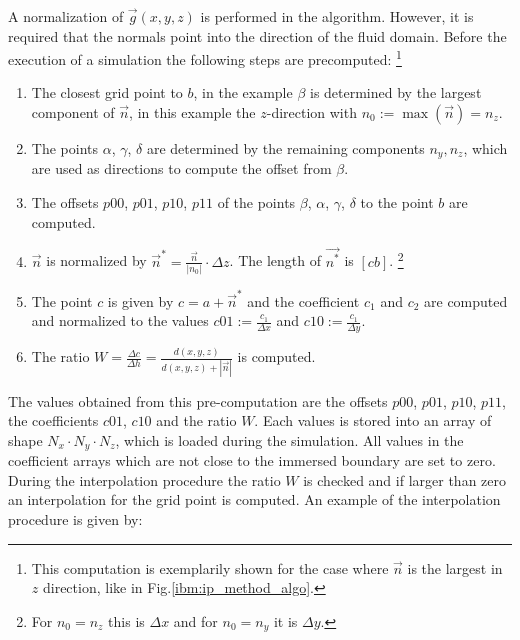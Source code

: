 A normalization of $\vec{g}(x, y, z)$ is performed in the algorithm.
However, it is required that the normals point into the direction of the fluid domain.
Before the execution of a simulation the following steps are precomputed:
\footnote{This computation is exemplarily shown for the case where $\vec{n}$ is the largest in $z$ direction, like in  Fig.\ref{ibm:ip_method_algo}.}


\begin{enumerate}
    \item The closest grid point to $b$, in the example  $\beta$ is determined by the largest component of $\vec{n}$, in this example
          the $z$-direction with $n_0 := \max(\vec{n}) = n_z$.

    \item The points $\alpha$, $\gamma$, $\delta$ are determined by the remaining components ${n_y, n_z}$, which are used as directions to
            compute the offset from $\beta$.

    \item The offsets $p00$, $p01$, $p10$, $p11$ of the points $\beta$, $\alpha$, $\gamma$, $\delta$ to the point $b$ are computed.

    \item $\vec{n}$ is normalized by $\vec{n}^* = \frac{\vec{n}}{|n_0|}\cdot \Delta z$. The length of $\vec{n^*}$ is $[cb]$.
            \footnote{For $n_0=n_z$ this is $\Delta x$ and for $n_0=n_y$ it is $\Delta y$.}

    \item The point $c$ is given by $c = a + \vec{n}^*$ and the coefficient $c_1$ and $c_2$ are computed and normalized to the values
           $c01 := \frac{c_1}{\Delta x}$ and $c10 := \frac{c_1}{\Delta y}$.
    \item The ratio $W=\frac{\Delta c}{\Delta h} = \frac{d(x, y, z)}{d(x, y, z) + |\vec{n}| }$ is computed.
\end{enumerate}

The values obtained from this pre-computation are the offsets  $p00$, $p01$, $p10$, $p11$, the coefficients $c01$, $c10$ and
the ratio $W$. Each values is stored into an array of shape $N_x \cdot N_y \cdot N_z$, which is loaded during the simulation.
All values in the coefficient arrays which are not close to the immersed boundary are set to zero.
During the interpolation procedure the ratio $W$ is checked and if larger than zero an interpolation for the grid point is computed.
An example of the interpolation procedure is given by:

